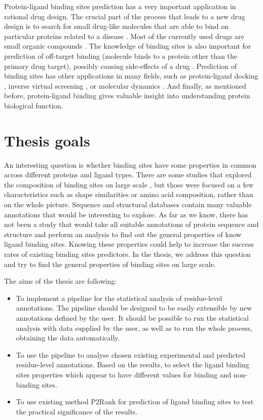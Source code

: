 Protein-ligand binding sites prediction has a very important application in rational drug design. The crucial part of the process that leads to a new drug design is to search for small drug-like molecules that are able to bind on particular proteins related to a disease \cite{drug_design}. Most of the currently used drugs are small organic compounds \cite{benchmark}. The knowledge of binding sites is also important for prediction of off-target binding (molecule binds to a protein other than the primary drug target), possibly causing side-effects of a drug \cite{offtarget}. Prediction of binding sites has other applications in many fields, such as protein-ligand docking \cite{docking}, inverse virtual screening \cite{screening}, or molecular dynamics \cite{dynamics}. And finally, as mentioned before, protein-ligand binding gives valuable insight into understanding protein biological function. 

\section{Thesis goals}

An interesting question is whether binding sites have some properties in common across different proteins and ligand types. There are some studies that explored the composition of binding sites on large scale \cite{lbscomposition, catalytic_res, binding_sites_char}, but those were focused on a few characteristics such as shape similarities or amino acid composition, rather than on the whole picture. Sequence and structural databases contain many valuable annotations that would be interesting to explore. As far as we know, there has not been a study that would take all suitable annotations of protein sequence and structure and perform an analysis to find out the general properties of know ligand binding sites. Knowing these properties could help to increase the success rates of existing binding sites predictors. In the thesis, we address this question and try to find the general properties of binding sites on large scale.

The aims of the thesis are following:

\begin{itemize}
\item To implement a pipeline for the statistical analysis of residue-level annotations. The pipeline should be designed to be easily extensible by new annotations defined by the user. It should be possible to run the statistical analysis with data supplied by the user, as well as to run the whole process, obtaining the data automatically.
\item To use the pipeline to analyse chosen existing experimental and predicted residue-level annotations. Based on the results, to select the ligand binding sites properties which appear to have different values for binding and non-binding sites.
\item To use existing method P2Rank \cite{p2rank1} for prediction of ligand binding sites to test the practical significance of the results.
\end{itemize}

